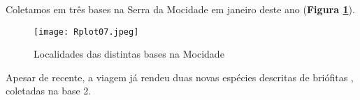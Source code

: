 \documentclass[12pt,a4paper]{article}\usepackage[]{graphicx}\usepackage[]{color}
\begin{document}




%
%


Coletamos em três bases na Serra da Mocidade em janeiro deste ano (\textbf{Figura \ref{fig:mapa_bases}}).

\begin{figure}[h]
\centering
\caption{Localidades das distintas bases na Mocidade}
\texttt{[image: Rplot07.jpeg]}
\label{fig:mapa_bases}
\end{figure}

Apesar de recente, a viagem já rendeu duas novas espécies descritas de briófitas \cite{bastos2016}, coletadas na base 2.

%
%

%


\end{document}
